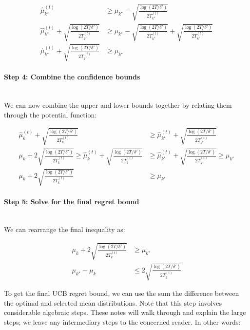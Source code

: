 \documentclass[11pt]{article}
\begin{document}
\begin{align}
    \hat{\mu}_{k^{\star}}^{(t)} &\geq \mu_{k^{\star}} - \sqrt{\frac{\log(2T/\delta')}{2T_{k^{\star}}^{(t)}}} \\
    \hat{\mu}_{k^{\star}}^{(t)} + \sqrt{\frac{\log(2T/\delta')}{2T_{k^{\star}}^{(t)}}} &\geq \mu_{k^{\star}} - \sqrt{\frac{\log(2T/\delta')}{2T_{k^{\star}}^{(t)}}} + \sqrt{\frac{\log(2T/\delta')}{2T_{k^{\star}}^{(t)}}} \\
    \hat{\mu}_{k^{\star}}^{(t)} + \sqrt{\frac{\log(2T/\delta')}{2T_{k^{\star}}^{(t)}}} &\geq \mu_{k^{\star}}
\end{align}


\paragraph{Step 4: Combine the confidence bounds}
\noindent \\
We can now combine the upper and lower bounds together by relating them through the potential function:

\begin{align}
    \hat{\mu}_k^{(t)} + \sqrt{\frac{\log(2T/\delta')}{2T_k^{(t)}}} &\geq \hat{\mu}_{k^{\star}}^{(t)} + \sqrt{\frac{\log(2T/\delta')}{2T_{k^{\star}}^{(t)}}} \\
    \mu_k + 2\sqrt{\frac{\log(2T/\delta')}{2T_k^{(t)}}} \geq \hat{\mu}_k^{(t)} + \sqrt{\frac{\log(2T/\delta')}{2T_k^{(t)}}} &\geq \hat{\mu}_{k^{\star}}^{(t)} + \sqrt{\frac{\log(2T/\delta')}{2T_{k^{\star}}^{(t)}}} \geq \mu_{k^{\star}} \\
    \mu_k + 2\sqrt{\frac{\log(2T/\delta')}{2T_k^{(t)}}} &\geq \mu_{k^{\star}}
\end{align}

\paragraph{Step 5: Solve for the final regret bound}
\noindent \\
We can rearrange the final inequality as:

\begin{align}
    \mu_k + 2\sqrt{\frac{\log(2T/\delta')}{2T_k^{(t)}}} &\geq \mu_{k^{\star}} \\
    \mu_{k^{\star}} - \mu_k &\leq 2\sqrt{\frac{\log(2T/\delta')}{2T_k^{(t)}}}
\end{align}

To get the final UCB regret bound, we can use the sum the difference between the optimal and selected mean distributions. Note that this step involves considerable algebraic steps. These notes will walk through and explain the large steps; we leave any intermediary steps to the concerned reader. In other words:
\end{document}
